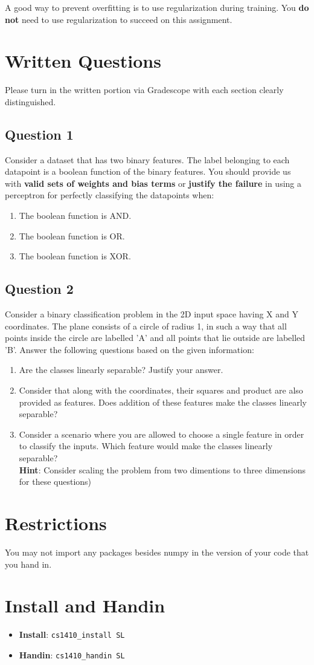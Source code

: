 \documentclass{article}
\begin{document}
A good way to prevent overfitting is to use regularization during training.
You \textbf{do not} need to use regularization to succeed on this assignment.

\section{Written Questions}
Please turn in the written portion via Gradescope with each section clearly distinguished.
\subsection{Question 1}
Consider a dataset that has two binary features. The label belonging to each datapoint is a boolean function of the binary features. You should provide us with \textbf{valid sets of weights and bias terms} or \textbf{justify the failure} in using a perceptron for perfectly classifying the datapoints when:
\begin{enumerate}
    \item The boolean function is AND.
    \item The boolean function is OR.
    \item The boolean function is XOR.
\end{enumerate}


\subsection{Question 2}
Consider a binary classification problem in the 2D input space having X and Y coordinates. The plane consists of a circle of radius 1, in such a way that all points inside the circle are labelled 'A' and all points that lie outside are labelled 'B'. Answer the following questions based on the given information:
\begin{enumerate}
    \item Are the classes linearly separable? Justify your answer.
    \item Consider that along with the coordinates, their squares and product are also provided as features. Does addition of these features make the classes linearly separable?
    \item Consider a scenario where you are allowed to choose a single feature in order to classify the inputs. Which feature would make the classes linearly separable?
    \\
\textbf{Hint}: Consider scaling the problem from two dimentions to three dimensions for these questions)
\end{enumerate}

\section{Restrictions}
You may not import any packages besides numpy in the version of your code that you hand in.

\section{Install and Handin}
\begin{itemize}
    \item \textbf{Install}: \verb|cs1410_install SL|
    
    \item \textbf{Handin}:
    \verb|cs1410_handin SL|
\end{itemize}
\end{document}
